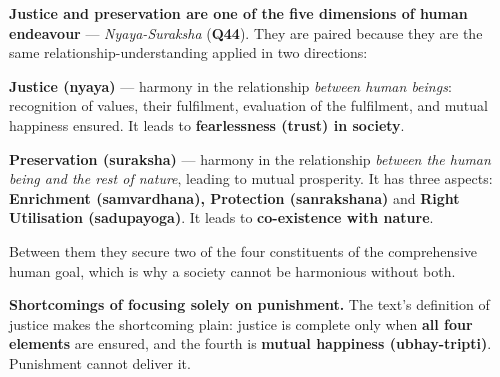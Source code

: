 
\ans \textbf{Justice and preservation are one of the five dimensions of human
endeavour} --- \emph{Nyaya-Suraksha} (\textbf{Q44}). They are paired because
they are the same relationship-understanding applied in two directions:

\begin{abul}
\item \textbf{Justice (nyaya)} --- harmony in the relationship \emph{between
      human beings}: recognition of values, their fulfilment, evaluation of
      the fulfilment, and mutual happiness ensured. It leads to
      \textbf{fearlessness (trust) in society}.
\item \textbf{Preservation (suraksha)} --- harmony in the relationship
      \emph{between the human being and the rest of nature}, leading to mutual
      prosperity. It has three aspects: \textbf{Enrichment (samvardhana),
      Protection (sanrakshana)} and \textbf{Right Utilisation (sadupayoga)}.
      It leads to \textbf{co-existence with nature}.
\end{abul}

Between them they secure two of the four constituents of the comprehensive
human goal, which is why a society cannot be harmonious without both.

\textbf{Shortcomings of focusing solely on punishment.} The text's definition
of justice makes the shortcoming plain: justice is complete only when
\textbf{all four elements} are ensured, and the fourth is \textbf{mutual
happiness (ubhay-tripti)}. Punishment cannot deliver it.

